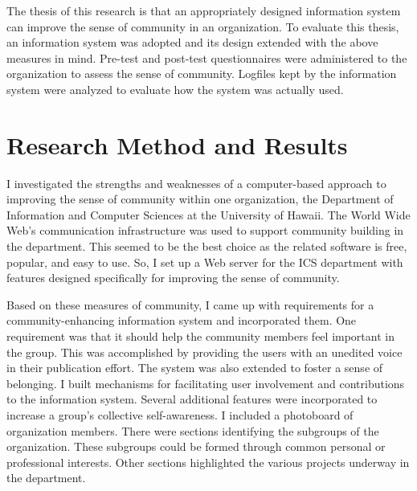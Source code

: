 The thesis of this research is that an appropriately designed information
system can improve the sense of community in an organization.  To evaluate this
thesis, an information system was adopted and its design extended with the
above measures in mind.  Pre-test and post-test questionnaires were
administered to the organization to assess the sense of community.  Logfiles
kept by the information system were analyzed to evaluate how the system was
actually used.

\section{Research Method and Results}
I investigated the strengths and weaknesses of a computer-based approach to
improving the sense of community within one organization, the Department of
Information and Computer Sciences at the University of Hawaii.  The World Wide
Web's communication infrastructure was used to support community building in
the department.  This seemed to be the best choice as the related software is
free, popular, and easy to use.  So, I set up a Web server for the ICS
department with features designed specifically for improving the sense of
community.

Based on these measures of community, I came up with requirements for a
community-enhancing information system and incorporated them.  One requirement
was that it should help the community members feel important in the group.
This was accomplished by providing the users with an unedited voice in their
publication effort.  The system was also extended to foster a sense of
belonging.  I built mechanisms for facilitating user involvement and
contributions to the information system.  Several additional features were
incorporated to increase a group's collective self-awareness.  I included a
photoboard of organization members.  There were sections identifying the
subgroups of the organization.  These subgroups could be formed through common
personal or professional interests.  Other sections highlighted the various
projects underway in the department.

